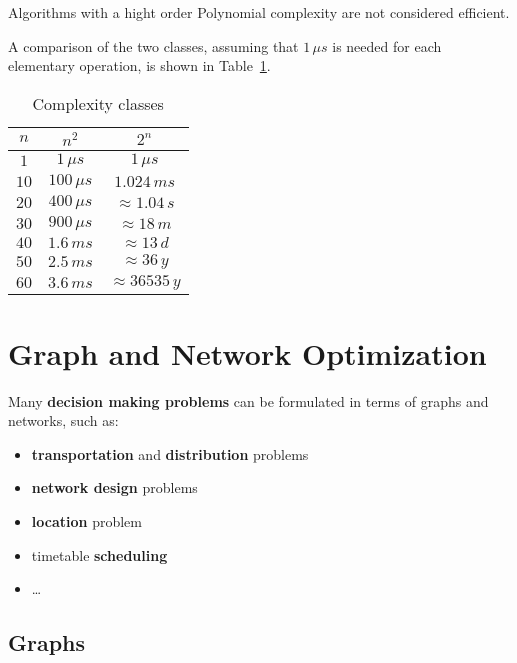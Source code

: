 \documentclass[english]{article}
\begin{document}
Algorithms with a hight order Polynomial complexity are not considered efficient.

A comparison of the two classes, assuming that \(1 \, \mu s\) is needed for each elementary operation, is shown in Table~\ref{tab:complexity-classes}.

\begin{table}
  \centering
  \bigskip
  \begin{tabular}{c|c|c}
    \(n\)  & \(n^2\)          & \(2^n\)                \\
    \hline
    \(1\)  & \(1 \, \mu s\)   & \(1 \, \mu s\)         \\
    \(10\) & \(100 \, \mu s\) & \(1.024 \, ms\)        \\
    \(20\) & \(400 \, \mu s\) & \(\approx 1.04\, s\)   \\
    \(30\) & \(900 \, \mu s\) & \(\approx 18 \, m\)    \\
    \(40\) & \(1.6 \, ms\)    & \(\approx 13 \, d\)    \\
    \(50\) & \(2.5 \, ms\)    & \(\approx 36 \, y\)    \\
    \(60\) & \(3.6 \, ms\)    & \(\approx 36535 \, y\) \\
  \end{tabular}
  \caption{Complexity classes}
  \label{tab:complexity-classes}
  \bigskip
\end{table}

\clearpage

\section{Graph and Network Optimization}

Many \textbf{decision making problems} can be formulated in terms of graphs and networks, such as:

\begin{itemize}
  \item \textbf{transportation} and \textbf{distribution} problems
  \item \textbf{network design} problems
  \item \textbf{location} problem
  \item timetable \textbf{scheduling}
  \item \ldots
\end{itemize}

\subsection{Graphs}
\end{document}
